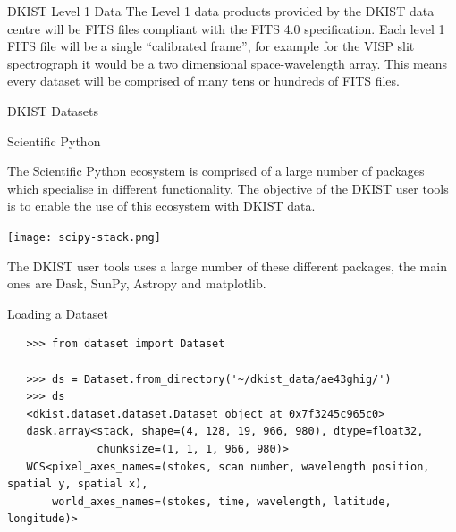 \documentclass[landscape,a0paper,fontscale=0.32]{baposter}
\begin{document}
\begin{poster}
\begin{posterbox}[name=intro,column=0,row=0,span=2]{DKIST Level 1 Data}
  The Level 1 data products provided by the DKIST data centre will be FITS files
  compliant with the FITS 4.0 specification. Each level 1 FITS file will be a
  single ``calibrated frame'', for example for the VISP slit spectrograph it
  would be a two dimensional space-wavelength array. This means every dataset
  will be comprised of many tens or hundreds of FITS files.

  
\end{posterbox}

\begin{posterbox}[name=dataset,column=0,row=0,span=1,below=intro]{DKIST Datasets}


  
\end{posterbox}

\begin{posterbox}[name=scipy,column=1,row=0,span=1,below=intro]{Scientific Python}

  The Scientific Python ecosystem is comprised of a large number of packages
  which specialise in different functionality. The objective of the DKIST user
  tools is to enable the use of this ecosystem with DKIST data.
  
  \texttt{[image: scipy-stack.png]}

  The DKIST user tools uses a large number of these different packages, the main
  ones are Dask, SunPy, Astropy and matplotlib.

\end{posterbox}
 
\begin{posterbox}[name=dataset,column=2,row=0,span=2]{Loading a Dataset}
 
  \begin{verbatim}
   >>> from dataset import Dataset

   >>> ds = Dataset.from_directory('~/dkist_data/ae43ghig/')
   >>> ds
   <dkist.dataset.dataset.Dataset object at 0x7f3245c965c0>
   dask.array<stack, shape=(4, 128, 19, 966, 980), dtype=float32,
              chunksize=(1, 1, 1, 966, 980)>
   WCS<pixel_axes_names=(stokes, scan number, wavelength position, spatial y, spatial x),
       world_axes_names=(stokes, time, wavelength, latitude, longitude)>
  \end{verbatim}

\end{posterbox}


\end{poster}
\end{document}
